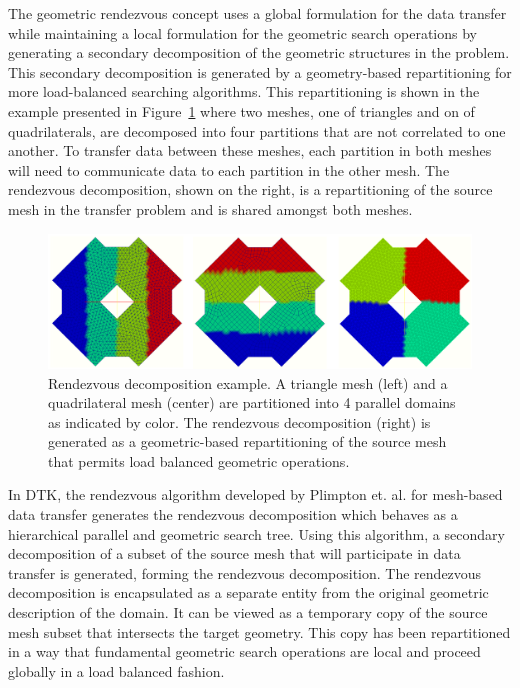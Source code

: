 \documentclass{mc2013}
\begin{document}
\label{subsec:rendezvous_algorithm}

The geometric rendezvous concept uses a global formulation for the
data transfer while maintaining a local formulation for the geometric
search operations by generating a secondary decomposition of the
geometric structures in the problem. This secondary decomposition is
generated by a geometry-based repartitioning for more load-balanced
searching algorithms. This repartitioning is shown in the example
presented in Figure~\ref{fig:rendezvous_example} where two meshes, one
of triangles and on of quadrilaterals, are decomposed into four
partitions that are not correlated to one another. To transfer data
between these meshes, each partition in both meshes will need to
communicate data to each partition in the other mesh. The rendezvous
decomposition, shown on the right, is a repartitioning of the source
mesh in the transfer problem and is shared amongst both meshes.
\begin{figure}[htpb!]
  \centering \includegraphics[width=6in]{rendezvous_example.png}
  \caption{Rendezvous decomposition example. A triangle mesh (left)
    and a quadrilateral mesh (center) are partitioned into 4 parallel
    domains as indicated by color. The rendezvous decomposition
    (right) is generated as a geometric-based repartitioning of the
    source mesh that permits load balanced geometric operations.}
  \label{fig:rendezvous_example}
\end{figure}

In DTK, the rendezvous algorithm developed by Plimpton
et. al. \cite{Plimpton_2004} for mesh-based data transfer generates
the rendezvous decomposition which behaves as a hierarchical parallel
and geometric search tree.  Using this algorithm, a secondary
decomposition of a subset of the source mesh that will participate in
data transfer is generated, forming the rendezvous decomposition. The
rendezvous decomposition is encapsulated as a separate entity from the
original geometric description of the domain. It can be viewed as a
temporary copy of the source mesh subset that intersects the target
geometry. This copy has been repartitioned in a way that fundamental
geometric search operations are local and proceed globally in a load
balanced fashion.
\end{document}
